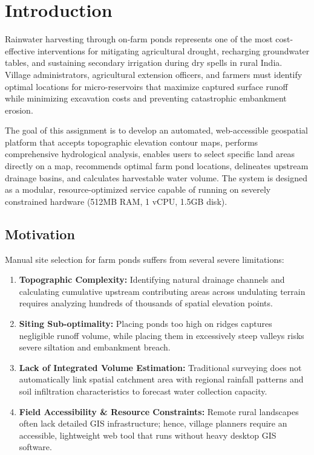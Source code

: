 \documentclass[manuscript,screen,review]{acmart}
\begin{document}

\maketitle

\section{Introduction}
\label{sec:intro}
Rainwater harvesting through on-farm ponds represents one of the most cost-effective interventions for mitigating agricultural drought, recharging groundwater tables, and sustaining secondary irrigation during dry spells in rural India. Village administrators, agricultural extension officers, and farmers must identify optimal locations for micro-reservoirs that maximize captured surface runoff while minimizing excavation costs and preventing catastrophic embankment erosion.

The goal of this assignment is to develop an automated, web-accessible geospatial platform that accepts topographic elevation contour maps, performs comprehensive hydrological analysis, enables users to select specific land areas directly on a map, recommends optimal farm pond locations, delineates upstream drainage basins, and calculates harvestable water volume. The system is designed as a modular, resource-optimized service capable of running on severely constrained hardware (512MB RAM, 1 vCPU, 1.5GB disk).

\subsection{Motivation}
Manual site selection for farm ponds suffers from several severe limitations:
\begin{enumerate}[noitemsep]
    \item \textbf{Topographic Complexity:} Identifying natural drainage channels and calculating cumulative upstream contributing areas across undulating terrain requires analyzing hundreds of thousands of spatial elevation points.
    \item \textbf{Siting Sub-optimality:} Placing ponds too high on ridges captures negligible runoff volume, while placing them in excessively steep valleys risks severe siltation and embankment breach.
    \item \textbf{Lack of Integrated Volume Estimation:} Traditional surveying does not automatically link spatial catchment area with regional rainfall patterns and soil infiltration characteristics to forecast water collection capacity.
    \item \textbf{Field Accessibility \& Resource Constraints:} Remote rural landscapes often lack detailed GIS infrastructure; hence, village planners require an accessible, lightweight web tool that runs without heavy desktop GIS software.
\end{enumerate}
\end{document}
